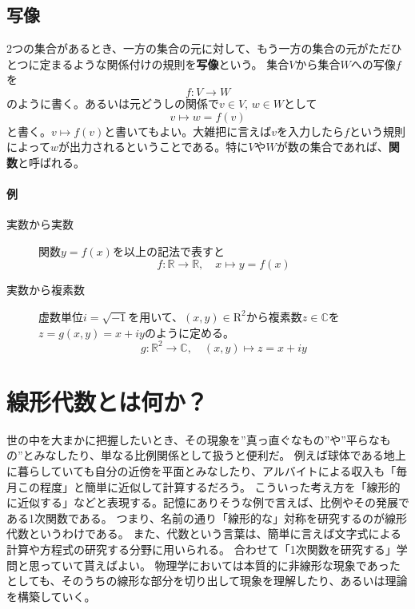 \documentclass[10pt]{jsarticle}
\theoremstyle{definition}%
\numberwithin{equation}{section}%
\begin{document}
\subsection{写像}
2つの集合があるとき、一方の集合の元に対して、もう一方の集合の元がただひとつに定まるような関係付けの規則を{\bf 写像}という。 
集合$V$から集合$W$への写像$f$を
\begin{equation}
  f:V \to W
\end{equation}
のように書く。あるいは元どうしの関係で$v\in V, \, w\in W$として
\begin{equation}
  v \mapsto w= f(v)
\end{equation}
と書く。$v \mapsto f(v)$と書いてもよい。大雑把に言えば$v$を入力したら$f$という規則によって$w$が出力されるということである。特に$V$や$W$が数の集合であれば、{\bf 関数}と呼ばれる。
\paragraph{例}
\begin{description}
  \item[実数から実数] 関数$y=f(x)$を以上の記法で表すと
  \begin{equation}
   f:\mathbb{R}\to\mathbb{R}, \quad x\mapsto y=f(x)
  \end{equation}
 \item[実数から複素数] 虚数単位$i=\sqrt{-1}$を用いて、$(x,y)\in \mathrm{R}^{2}$から複素数$z\in \mathbb{C}$を$z=g(x,y)=x+iy$のように定める。
 \begin{equation}
  g:\mathbb{R}^{2}\to \mathbb{C},\quad (x,y)\mapsto z=x+iy
 \end{equation}
 
\end{description}
\section{線形代数とは何か？}
世の中を大まかに把握したいとき、その現象を''真っ直ぐなもの''や''平らなもの''とみなしたり、単なる比例関係として扱うと便利だ。
例えば球体である地上に暮らしていても自分の近傍を平面とみなしたり、アルバイトによる収入も「毎月この程度」と簡単に近似して計算するだろう。
こういった考え方を「線形的に近似する」などと表現する。記憶にありそうな例で言えば、比例やその発展である1次関数である。
つまり、名前の通り「線形的な」対称を研究するのが線形代数というわけである。
また、代数という言葉は、簡単に言えば文字式による計算や方程式の研究する分野に用いられる。
合わせて「1次関数を研究する」学問と思っていて貰えばよい。
物理学においては本質的に非線形な現象であったとしても、そのうちの線形な部分を切り出して現象を理解したり、あるいは理論を構築していく。
\end{document}
